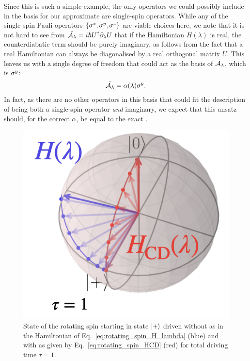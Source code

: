     Since this is such a simple example, the only operators we could possibly include in the basis for our approximate  are single-spin operators. While any of the single-spin Pauli operators $\{ \sigma^x, \sigma^y, \sigma^z\}$ are viable choices here, we note that it is not hard to see from $\Tilde{\mathcal{A}_{\lambda}} = i\hbar U^{\dagger} \partial_{\lambda} U$ that if the Hamiltonian $H(\lambda)$ is real, the counterdiabatic term should be purely imaginary, as follows from the fact that a real Hamiltonian can always be diagonalised by a real orthogonal matrix $U$. This leaves us with a single degree of freedom that could act as the basis of $\Bar{\mathcal{A}_{\lambda}}$, which is $\sigma^y$:
    \begin{equation}
        \Bar{\mathcal{A}_{\lambda}} = \alpha(\lambda) \sigma^y.
    \end{equation}
    In fact, as there are no other operators in this basis that could fit the description of being both a single-spin operator \emph{and} imaginary, we expect that this ansatz should, for the correct $\alpha$, be equal to the exact .

    \begin{figure}
    \centering
    \includegraphics[width=0.9\linewidth]{images/rotating_spin_CD.png} \caption[Rotating spin Bloch sphere illustration with counterdiabatic driving]{State of the rotating spin starting in state $\ket{+}$ driven without  as in the Hamiltonian of Eq.~\eqref{eq:rotating_spin_H_lambda} (blue) and with  as given by Eq.~\eqref{eq:rotating_spin_HCD} (red) for total driving time $\tau = 1$.}\label{fig:rotating_CD}
    \end{figure}
    
